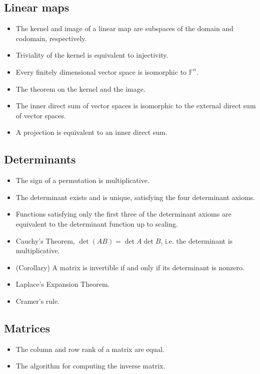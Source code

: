 \documentclass[12pt]{article}
\begin{document}
\begin{multicols}{2}
\subsection{Linear maps}

\begin{itemize}
    \item The kernel and image of a linear map are subspaces of the
        domain and codomain, respectively.
    \item Triviality of the kernel is equivalent to injectivity.
    \item Every finitely dimensional vector space is isomorphic to
        $\mathbb{F}^n$.
    \item The theorem on the kernel and the image.
    \item The inner direct sum of vector spaces is isomorphic to
        the external direct sum of vector spaces.
    \item A projection is equivalent to an inner direct sum.
\end{itemize}


\subsection{Determinants}

\begin{itemize}
    \item The sign of a permutation is multiplicative.
    \item The determinant exists and is unique, satisfying the four
        determinant axioms.
    \item Functions satisfying only the first three of the
        determinant axioms are equivalent to the determinant
        function up to scaling.
    \item Cauchy's Theorem, $\det {(AB)} = \det{A} \det{B}$, i.e.
        the determinant is multiplicative.
    \item (Corollary) A matrix is invertible if and only if its
        determinant is nonzero.
    \item Laplace's Expansion Theorem.
    \item Cramer's rule.
\end{itemize}

\subsection{Matrices}

\begin{itemize}
    \item The column and row rank of a matrix are equal.
    \item The algorithm for computing the inverse matrix.
\end{itemize}



\end{multicols}
\end{document}
